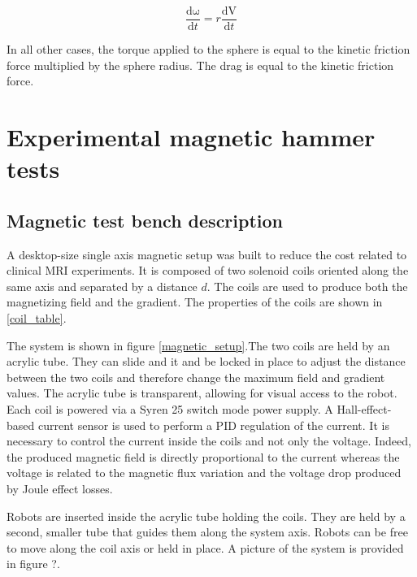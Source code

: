 \documentclass[letterpaper, 10 pt, conference]{ieeeconf}  %
\begin{document}
\begin{equation}
\frac{\mathrm{d\omega } }{\mathrm{d} t}=r\frac{\mathrm{dV } }{\mathrm{d} t}
\label{domega}
\end{equation}

In all other cases, the torque applied to the sphere is equal to the kinetic friction force multiplied by the sphere radius. The drag is equal to the kinetic friction force.


\section{Experimental magnetic hammer tests}

\subsection{Magnetic test bench description}

A desktop-size single axis magnetic setup was built to reduce the cost related to clinical MRI experiments. It is composed of two solenoid coils oriented along the same axis and separated by a distance $d$. The coils are used to produce both the magnetizing field and the gradient. The properties of the coils are shown in \cref{coil_table}.\par
The system is shown in figure \cref{magnetic_setup}.The two coils are held by an acrylic tube. They can slide and it and be locked in place to adjust the distance between the two coils and therefore change the maximum field and gradient values. The acrylic tube is transparent, allowing for visual access to the robot.
Each coil is powered via a Syren 25 switch mode power supply. A Hall-effect-based current sensor is used to perform a PID regulation of the current. It is necessary to control the current inside the coils and not only the voltage. Indeed, the produced magnetic field is directly proportional to the current whereas the voltage is related to the magnetic flux variation and the voltage drop produced by Joule effect losses.\par
Robots are inserted inside the acrylic tube holding the coils. They are held by a second, smaller tube that guides them along the system axis. Robots can be free to move along the coil axis or held in place. A picture of the system is provided in figure ?.
\end{document}
